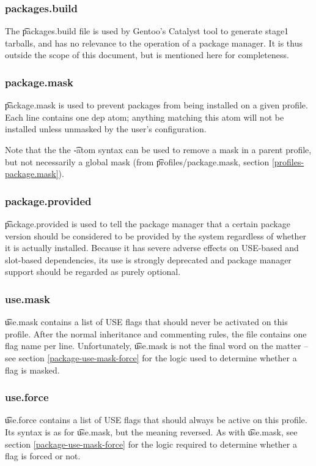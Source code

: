\subsubsection{packages.build}
The \t{packages.build} file is used by Gentoo's Catalyst tool to generate stage1 tarballs, and has
no relevance to the operation of a package manager. It is thus outside the scope of this document,
but is mentioned here for completeness.

\subsubsection{package.mask}
\t{package.mask} is used to prevent packages from being installed on a given profile. Each line
contains one dep atom; anything matching this atom will not be installed unless unmasked by the
user's configuration.

Note that the the \t{-atom} syntax can be used to remove a mask in a parent profile, but not
necessarily a global mask (from \t{profiles/package.mask}, section \ref{profiles-package.mask}).

\subsubsection{package.provided}
\t{package.provided} is used to tell the package manager that a certain package version should be
considered to be provided by the system regardless of whether it is actually installed. Because it
has severe adverse effects on USE-based and slot-based dependencies, its use is strongly deprecated
and package manager support should be regarded as purely optional.

\subsubsection{use.mask}
\t{use.mask} contains a list of USE flags that should never be activated on this profile. After the
normal inheritance and commenting rules, the file contains one flag name per line. Unfortunately,
\t{use.mask} is not the final word on the matter -- see section \ref{package-use-mask-force} for the
logic used to determine whether a flag is masked.

\subsubsection{use.force}
\t{use.force} contains a list of USE flags that should always be active on this profile. Its syntax
is as for \t{use.mask}, but the meaning reversed. As with \t{use.mask}, see section
\ref{package-use-mask-force} for the logic required to determine whether a flag is forced or not.

